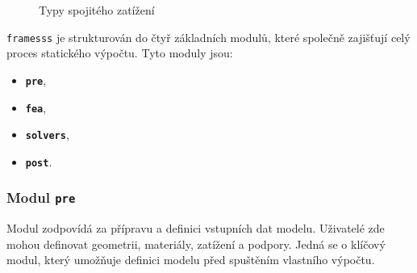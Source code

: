\begin{figure}[H]
    
    \caption{Typy spojitého zatížení}
    \label{fig:distributed_load}
\end{figure}

\texttt{framesss} je strukturován do čtyř základních modulů, které společně zajišťují celý proces statického výpočtu. Tyto moduly jsou:
\begin{itemize}
    \item \textbf{\texttt{pre}},
    \item \textbf{\texttt{fea}},
    \item \textbf{\texttt{solvers}},
    \item \textbf{\texttt{post}}.
\end{itemize}


\subsubsection*{Modul \texttt{pre}}
Modul zodpovídá za přípravu a definici vstupních dat modelu. Uživatelé zde mohou definovat geometrii, materiály, zatížení a podpory. Jedná se o klíčový modul, který umožňuje definici modelu před spuštěním vlastního výpočtu.

